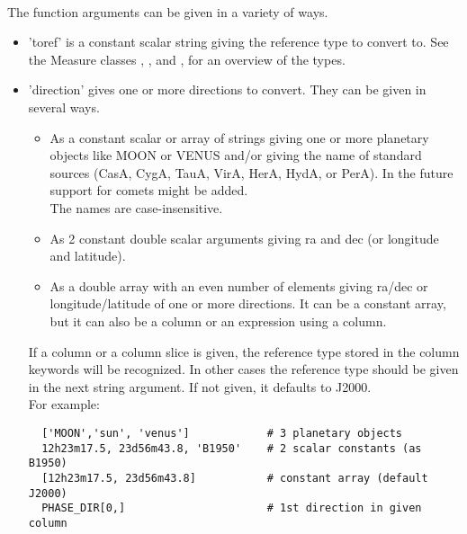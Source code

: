 \paragraph*{}
The function arguments can be given in a variety of ways.
\begin{itemize}
\item 'toref' is a constant scalar string giving the reference type to
  convert to. See the Measure classes
  ,
  , and
  ,
  for an overview of the types.
\item 'direction' gives one or more directions to convert. They can be
  given in several ways.
  \begin{itemize}
    \item As a constant scalar or array of strings giving one or more planetary objects
      like MOON or VENUS and/or giving the name of standard sources
      (CasA, CygA, TauA, VirA, HerA, HydA, or PerA).
      In the future support for comets might be added. 
      \\The names are case-insensitive.
    \item As 2 constant double scalar arguments giving ra and dec (or
      longitude and latitude).
    \item As a double array with an even number of elements giving
      ra/dec or longitude/latitude of one or more directions.
      It can be a constant array, but it
      can also be a column or an expression using a column.
  \end{itemize}
  If a column or a column slice is given, the reference type stored in
  the column keywords will be recognized. In other cases the reference
  type should be given in the next string argument. If not given, it
  defaults to J2000.
  \\For example:
\begin{verbatim}
  ['MOON','sun', 'venus']            # 3 planetary objects
  12h23m17.5, 23d56m43.8, 'B1950'    # 2 scalar constants (as B1950)
  [12h23m17.5, 23d56m43.8]           # constant array (default J2000)
  PHASE_DIR[0,]                      # 1st direction in given column
\end{verbatim}


\end{itemize}
